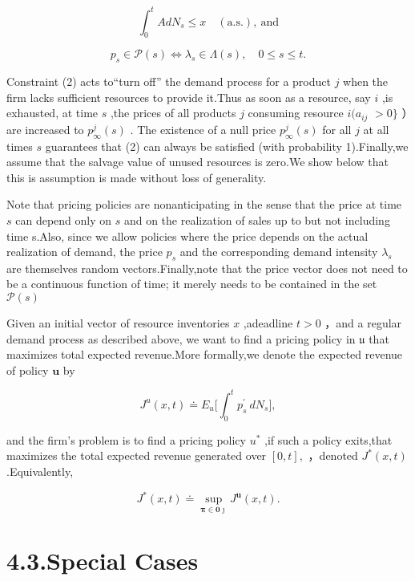 \[
\int _ { 0 } ^ { t } A d N _ { s } \leqslant x \quad \mathrm { ( a . s . ) , ~ a n d }
\]

\[
p _ { s } \in \mathcal { P } ( s ) \Leftrightarrow \lambda _ { s } \in \Lambda ( s ) , \quad 0 \leqslant s \leqslant t .
\]

Constraint (2) acts to``turn off'' the demand process for a product \(j\) when the firm lacks sufficient resources to provide it.Thus as soon as a resource, say \(i\) ,is exhausted, at time \(s\) ,the prices of all products \(j\) consuming resource \(i ( a _ { i j }\) \(> 0 \}\) ）are increased to \(p _ { \infty } ^ { j } ( s )\) . The existence of a null price \(p _ { \infty } ^ { j } ( s )\) for all \(j\) at all times \(s\) guarantees that (2) can always be satisfied (with probability 1).Finally,we assume that the salvage value of unused resources is zero.We show below that this is assumption is made without loss of generality.

Note that pricing policies are nonanticipating in the sense that the price at time \(s\) can depend only on \(s\) and on the realization of sales up to but not including time s.Also, since we allow policies where the price depends on the actual realization of demand, the price \(p _ { s }\) and the corresponding demand intensity \(\lambda _ { s }\) are themselves random vectors.Finally,note that the price vector does not need to be a continuous function of time; it merely needs to be contained in the set \(\mathcal { P } ( s )\)

Given an initial vector of resource inventories \(x\) ,adeadline \(t > 0\) ，and a regular demand process as described above, we want to find a pricing policy in \(\mathfrak { u }\) that maximizes total expected revenue.More formally,we denote the expected revenue of policy \(\boldsymbol { u }\) by

\[
J ^ { u } ( x , t ) \doteq E _ { u } \biggl [ \int _ { 0 } ^ { t } p _ { s } ^ { \prime } \ d N _ { s } \biggl ] ,
\]

and the firm's problem is to find a pricing policy \(u ^ { * }\) ,if such a policy exits,that maximizes the total expected revenue generated over \([ 0 , t ] ,\) ，denoted \(J ^ { * } ( x , t )\) .Equivalently,

\[
J ^ { * } ( x , t ) \doteq \operatorname* { s u p } _ { \boldsymbol { \pi } \in \boldsymbol { 0 } \boldsymbol { \jmath } } J ^ { \boldsymbol { u } } ( x , t ) .
\]

\section{4.3.Special Cases}\label{special-cases}

